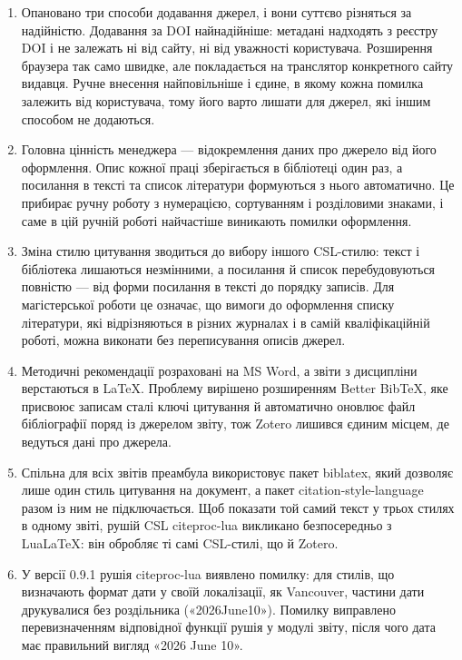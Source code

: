 \documentclass[14pt,a4paper]{extreport}
\begin{document}
\begin{enumerate}[ref=\arabic*]
\item Опановано три способи додавання джерел, і вони суттєво різняться за надійністю. Додавання за DOI найнадійніше: метадані надходять з реєстру DOI і не залежать ні від сайту, ні від уважності користувача. Розширення браузера так само швидке, але покладається на транслятор конкретного сайту видавця. Ручне внесення найповільніше і єдине, в якому кожна помилка залежить від користувача, тому його варто лишати для джерел, які іншим способом не додаються.

\item Головна цінність менеджера — відокремлення даних про джерело від його оформлення. Опис кожної праці зберігається в бібліотеці один раз, а посилання в тексті та список літератури формуються з нього автоматично. Це прибирає ручну роботу з нумерацією, сортуванням і розділовими знаками, і саме в цій ручній роботі найчастіше виникають помилки оформлення.

\item Зміна стилю цитування зводиться до вибору іншого CSL-стилю: текст і бібліотека лишаються незмінними, а посилання й список перебудовуються повністю — від форми посилання в тексті до порядку записів. Для магістерської роботи це означає, що вимоги до оформлення списку літератури, які відрізняються в різних журналах і в самій кваліфікаційній роботі, можна виконати без переписування описів джерел.

\item Методичні рекомендації розраховані на MS Word, а звіти з дисципліни верстаються в LaTeX. Проблему вирішено розширенням Better BibTeX, яке присвоює записам сталі ключі цитування й автоматично оновлює файл бібліографії поряд із джерелом звіту, тож Zotero лишився єдиним місцем, де ведуться дані про джерела.

\item Спільна для всіх звітів преамбула використовує пакет biblatex, який дозволяє лише один стиль цитування на документ, а пакет citation-style-language разом із ним не підключається. Щоб показати той самий текст у трьох стилях в одному звіті, рушій CSL citeproc-lua викликано безпосередньо з LuaLaTeX: він обробляє ті самі CSL-стилі, що й Zotero.

\item У версії 0.9.1 рушія citeproc-lua виявлено помилку: для стилів, що визначають формат дати у своїй локалізації, як Vancouver, частини дати друкувалися без роздільника («2026June10»). Помилку виправлено перевизначенням відповідної функції рушія у модулі звіту, після чого дата має правильний вигляд «2026 June 10».


\end{enumerate}
\end{document}
